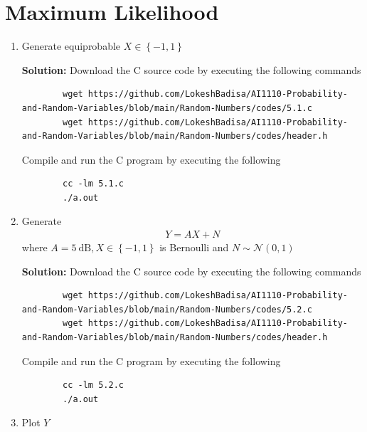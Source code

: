 \documentclass[journal,12pt,twocolumn]{IEEEtran}
\newcommand{\solution}{\noindent \textbf{Solution: }}
\providecommand{\cbrak}[1]{\ensuremath{\left\{#1\right\}}}
\providecommand{\gauss}[2]{\mathcal{N}\ensuremath{\left(#1,#2\right)}}
\numberwithin{equation}{section}
\renewcommand\thesection{\arabic{section}}
\begin{document}
	\section{Maximum Likelihood}
	\begin{enumerate}[label=\thesection.\arabic*,ref=\thesection.\theenumi]
	\item Generate equiprobable 	$X \in \cbrak{-1, 1}$
	
	\solution Download the C source code by executing the following commands
	\begin{lstlisting}
		wget https://github.com/LokeshBadisa/AI1110-Probability-and-Random-Variables/blob/main/Random-Numbers/codes/5.1.c
		wget https://github.com/LokeshBadisa/AI1110-Probability-and-Random-Variables/blob/main/Random-Numbers/codes/header.h
	\end{lstlisting}
	Compile and run the C program by executing the following
	\begin{lstlisting}
		cc -lm 5.1.c
		./a.out
	\end{lstlisting}
	
	\item Generate 
	\begin{align}
		Y = AX+N
	\end{align}
	where $A = 5 ~\mathrm{dB}, X \in \cbrak{-1, 1}$ is Bernoulli and $N \sim \gauss{0}{1}$
	
	\solution Download the C source code by executing the following commands
	\begin{lstlisting}
		wget https://github.com/LokeshBadisa/AI1110-Probability-and-Random-Variables/blob/main/Random-Numbers/codes/5.2.c
		wget https://github.com/LokeshBadisa/AI1110-Probability-and-Random-Variables/blob/main/Random-Numbers/codes/header.h
	\end{lstlisting}
	Compile and run the C program by executing the following
	\begin{lstlisting}
		cc -lm 5.2.c
		./a.out
	\end{lstlisting}
	
	\item Plot $Y$
	

\end{enumerate}
\end{document}
